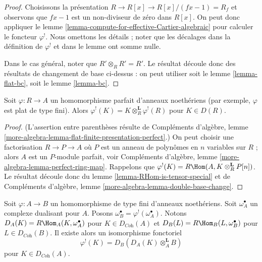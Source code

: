 \begin{proof}
Choisissons la présentation $R \to R[x] \to R[x]/(fx - 1) = R_f$ et observons que $fx - 1$
est un non-diviseur de zéro dans $R[x]$.
On peut donc appliquer le lemme \ref{lemma-compute-for-effective-Cartier-algebraic} pour calculer le foncteur $\varphi^!$.
Nous omettons les détails ; noter que les décalages dans la définition
de $\varphi^!$ et dans le lemme ont somme nulle.

\medskip\noindent
Dans le cas général, noter que $R' \otimes_R R' = R'$.
Le résultat découle donc des résultats de changement de base ci-dessus :
on peut utiliser soit le lemme \ref{lemma-flat-bc}, soit le lemme \ref{lemma-bc}.
\end{proof}

\begin{lemma}
\label{lemma-upper-shriek-is-tensor-functor}
Soit $\varphi : R \to A$ un homomorphisme parfait d'anneaux noethériens
(par exemple, $\varphi$ est plat de type fini).
Alors $\varphi^!(K) = K \otimes_R^\mathbf{L} \varphi^!(R)$ pour $K \in D(R)$.
\end{lemma}

\begin{proof}
(L'assertion entre parenthèses résulte de Compléments d'algèbre, lemme \ref{more-algebra-lemma-flat-finite-presentation-perfect}.)
On peut choisir une factorisation $R \to P \to A$ où $P$ est un anneau de polynômes
en $n$ variables sur $R$ ; alors $A$ est un $P$-module parfait,
voir Compléments d'algèbre, lemme \ref{more-algebra-lemma-perfect-ring-map}.
Rappelons que $\varphi^!(K) = R\Hom(A, K \otimes_R^\mathbf{L} P[n])$.
Le résultat découle donc du lemme \ref{lemma-RHom-is-tensor-special}
et de Compléments d'algèbre, lemme \ref{more-algebra-lemma-double-base-change}.
\end{proof}

\begin{lemma}
\label{lemma-relative-dualizing-if-have-omega}
Soit $\varphi : A \to B$ un homomorphisme de type fini d'anneaux noethériens.
Soit $\omega_A^\bullet$ un complexe dualisant pour $A$. Posons $\omega_B^\bullet = \varphi^!(\omega_A^\bullet)$.
Notons $D_A(K) = R\Hom_A(K, \omega_A^\bullet)$ pour $K \in D_{\textit{Coh}}(A)$ et $D_B(L) = R\Hom_B(L, \omega_B^\bullet)$ pour $L \in D_{\textit{Coh}}(B)$.
Il existe alors un isomorphisme fonctoriel
$$
\varphi^!(K) = D_B(D_A(K) \otimes_A^\mathbf{L} B)
$$
pour $K \in D_{\textit{Coh}}(A)$.
\end{lemma}

